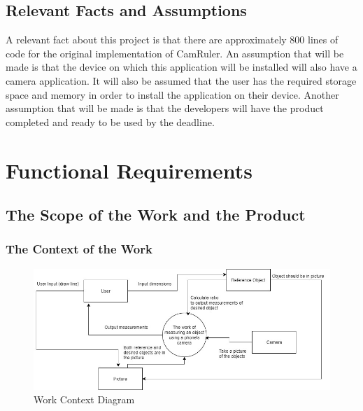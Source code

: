 \documentclass[12pt, titlepage]{article}
\begin{document}
\subsection{Relevant Facts and Assumptions}

A relevant fact about this project is that there are approximately 800 lines of code for the original implementation of CamRuler. An assumption that will be made is that the device on which this application will be installed will also have a camera application. It will also be assumed that the user has the required storage space and memory in order to install the application on their device. Another assumption that will be made is that the developers will have the product completed and ready to be used by the deadline.


\section{Functional Requirements}

\subsection{The Scope of the Work and the Product}

\subsubsection{The Context of the Work}
\begin{figure}[H]
   \centering
   \includegraphics[width=6in]{work.jpg} 
   \caption{Work Context Diagram}
   \label{fig:1}
\end{figure}
\end{document}
